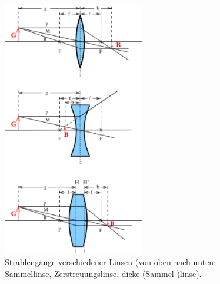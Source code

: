 \begin{figure}[hb]
	\centering
	\includegraphics[width=0.55\textwidth]{Bilder/Bildkonstruktionen.pdf}
	\caption{Strahlengänge verschiedener Linsen (von oben nach unten: Sammellinse, Zerstreuungslinse, dicke (Sammel-)linse). \cite{skript}}
	\label{fig:strahlengaenge}
\end{figure}